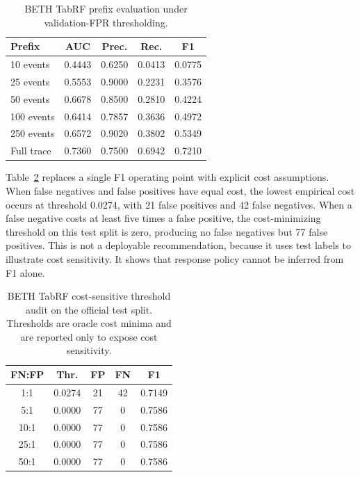 \documentclass[10pt,journal,compsoc]{IEEEtran}
\begin{document}
\begin{table}[t]
\centering
\caption{BETH TabRF prefix evaluation under validation-FPR thresholding.}
\label{tab:beth_prefix}
\begin{tabular}{lcccc}
\toprule
\textbf{Prefix} & \textbf{AUC} & \textbf{Prec.} & \textbf{Rec.} & \textbf{F1} \\
\midrule
10 events & 0.4443 & 0.6250 & 0.0413 & 0.0775 \\
25 events & 0.5553 & 0.9000 & 0.2231 & 0.3576 \\
50 events & 0.6678 & 0.8500 & 0.2810 & 0.4224 \\
100 events & 0.6414 & 0.7857 & 0.3636 & 0.4972 \\
250 events & 0.6572 & 0.9020 & 0.3802 & 0.5349 \\
Full trace & 0.7360 & 0.7500 & 0.6942 & 0.7210 \\
\bottomrule
\end{tabular}
\end{table}

Table~\ref{tab:beth_cost} replaces a single F1 operating point with explicit cost assumptions. When false negatives and false positives have equal cost, the lowest empirical cost occurs at threshold 0.0274, with 21 false positives and 42 false negatives. When a false negative costs at least five times a false positive, the cost-minimizing threshold on this test split is zero, producing no false negatives but 77 false positives. This is not a deployable recommendation, because it uses test labels to illustrate cost sensitivity. It shows that response policy cannot be inferred from F1 alone.

\begin{table}[t]
\centering
\caption{BETH TabRF cost-sensitive threshold audit on the official test split. Thresholds are oracle cost minima and are reported only to expose cost sensitivity.}
\label{tab:beth_cost}
\begin{tabular}{ccccc}
\toprule
\textbf{FN:FP} & \textbf{Thr.} & \textbf{FP} & \textbf{FN} & \textbf{F1} \\
\midrule
1:1 & 0.0274 & 21 & 42 & 0.7149 \\
5:1 & 0.0000 & 77 & 0 & 0.7586 \\
10:1 & 0.0000 & 77 & 0 & 0.7586 \\
25:1 & 0.0000 & 77 & 0 & 0.7586 \\
50:1 & 0.0000 & 77 & 0 & 0.7586 \\
\bottomrule
\end{tabular}
\end{table}
\end{document}
